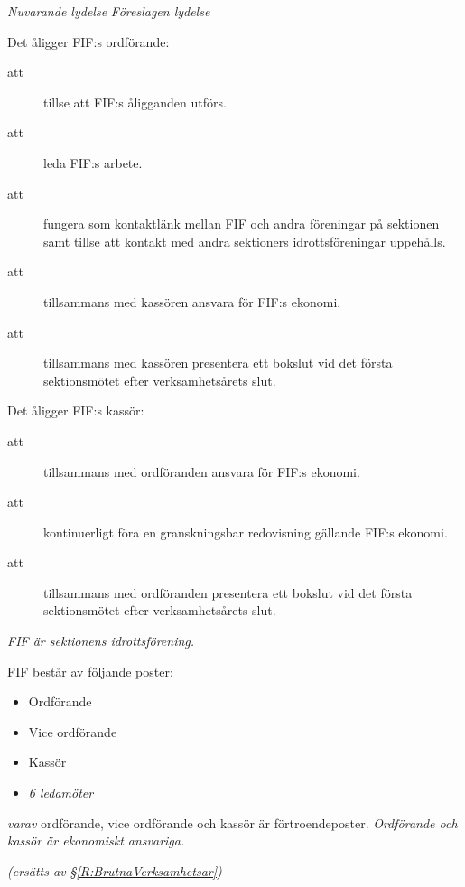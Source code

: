\documentclass{article}
\newenvironment{lydelse}
    {\begin{paracol}{2}%
        \emph{Nuvarande lydelse}%
        \switchcolumn%
        \emph{Föreslagen lydelse}%
    \end{paracol}%
    \begin{enumerate}[label=\thesubsection.\arabic*]%
    \begin{paracol}{2}%
    }{\end{paracol}\end{enumerate}}
\begin{document}
\begin{lydelse}
	\item Det åligger FIF:s ordförande:
	\begin{description}
  		\item[att] tillse att FIF:s åligganden utförs.
  		\item[att] leda FIF:s arbete.
  		\item[att] fungera som kontaktlänk mellan FIF och andra föreningar på sektionen samt tillse att kontakt med andra sektioners idrottsföreningar uppehålls.
  		\item[att] tillsammans med kassören ansvara för FIF:s ekonomi.
  		\item[att] tillsammans med kassören presentera ett bokslut vid det första sektionsmötet efter verksamhetsårets slut.
	\end{description}
	
	\setcounter{enumi}{6}
	
	\item Det åligger FIF:s kassör:
	\begin{description}
		\item[att] tillsammans med ordföranden ansvara för FIF:s ekonomi.
		\item[att] kontinuerligt föra en granskningsbar redovisning gällande FIF:s ekonomi.
		\item[att] tillsammans med ordföranden presentera ett bokslut vid det första sektionsmötet efter verksamhetsårets slut.
	\end{description}
    
    \setcounter{section}{6}
    \setcounter{subsection}{4}
    
    \switchcolumn
    
    \item \emph{FIF är sektionens idrottsförening.}

    \item FIF består av följande poster:
    \begin{itemize}
        \item Ordförande
    	\item Vice ordförande
    	\item Kassör
    	\item \emph{6 ledamöter}
    \end{itemize}
    \emph{varav} ordförande, vice ordförande och kassör är förtroendeposter.
    \emph{Ordförande och kassör är ekonomiskt ansvariga.} \label{R:FIFekansvar}
    
    \item[] \emph{(ersätts av \S \ref{R:BrutnaVerksamhetsar})}\vspace{1.2em}
    

\end{lydelse}
\end{document}
